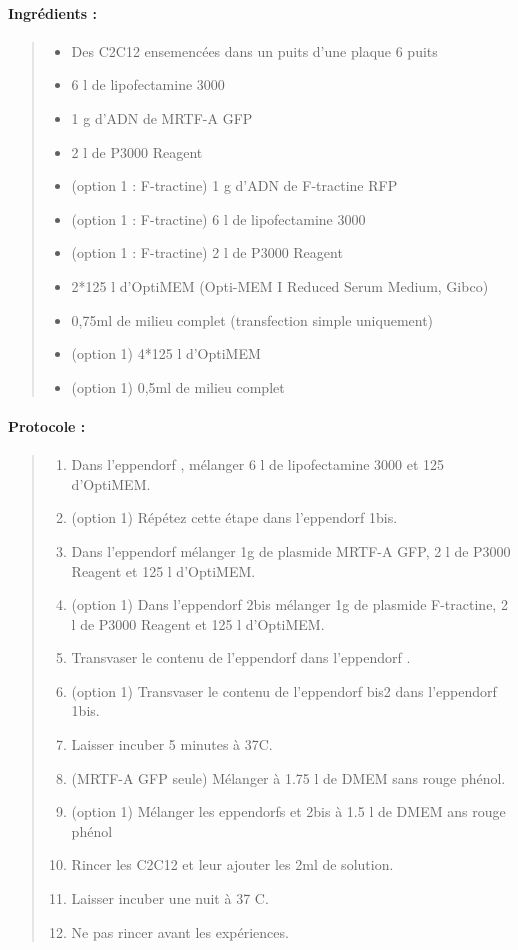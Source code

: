 \paragraph{Ingrédients :}
\begin{quote}

	\begin{itemize}
	\item Des C2C12 ensemencées dans un puits d'une plaque 6 puits
	\item 6 \micro l de lipofectamine 3000 
	\item 1 \micro g d'ADN de MRTF-A GFP
	\item 2 \micro l de P3000 Reagent
	\item (option 1 : F-tractine) 1 \micro g d'ADN de F-tractine RFP
	\item (option 1 : F-tractine) 6 \micro l de lipofectamine 3000
	\item (option 1 : F-tractine) 2 \micro l de P3000 Reagent
	\item 2*125 \micro l d'OptiMEM (Opti-MEM I Reduced Serum Medium, Gibco)
	\item 0,75ml de milieu complet (transfection simple uniquement)
	\item (option 1) 4*125 \micro l d'OptiMEM
	\item (option 1) 0,5ml de milieu complet 
	\end{itemize}
\end{quote}
\paragraph{Protocole : }
\begin{quote}
\begin{enumerate}
	\item Dans l'eppendorf , mélanger 6 \micro l de lipofectamine 3000 et 125 \micro d'OptiMEM. 
	\item (option 1) Répétez cette étape dans l'eppendorf \no 1bis. 
	\item Dans l'eppendorf  mélanger 1\micro g de plasmide MRTF-A GFP, 2 \micro l de P3000 Reagent et 125 \micro l d'OptiMEM.
	\item (option 1) Dans l'eppendorf \no 2bis mélanger 1\micro g de plasmide F-tractine, 2 \micro l de P3000 Reagent et 125 \micro l d'OptiMEM.
	\item Transvaser le contenu de l'eppendorf  dans l'eppendorf . 
	\item (option 1) Transvaser le contenu de l'eppendorf \no bis2 dans l'eppendorf \no 1bis. 
	\item Laisser incuber 5 minutes à 37\degres C. 
	\item (MRTF-A GFP seule) Mélanger à 1.75 \micro l de DMEM sans rouge phénol.
	\item (option 1) Mélanger les eppendorfs  et \no 2bis à 1.5 \micro l de DMEM ans rouge phénol
	\item Rincer les C2C12 et leur ajouter les 2ml de solution. 
	\item Laisser incuber une nuit à 37 \degres C.
	\item Ne pas rincer avant les expériences.
\end{enumerate}
\end{quote}

